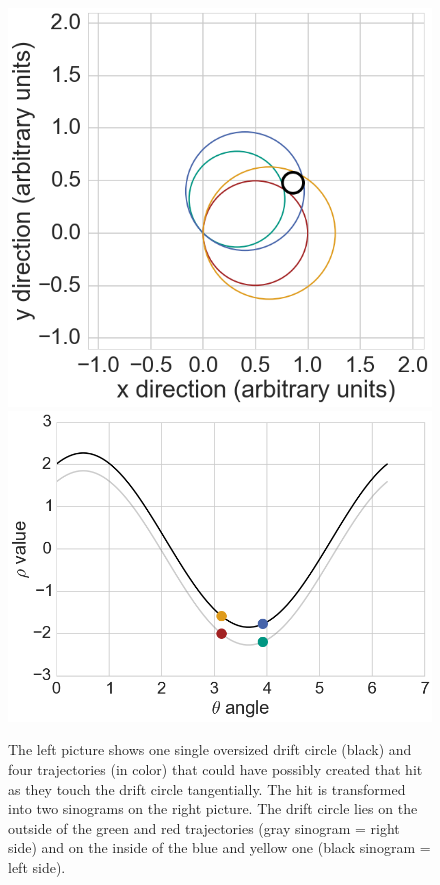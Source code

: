 \begin{figure}
  \centering
  \includegraphics[scale=0.27]{figures/theory/sinosodial_1.png}
  \hspace*{1cm}
  \includegraphics[scale=0.27]{figures/theory/sinosodial_2.png}
  \caption[Sinograms in the Legendre algorithm.]{The left picture shows one single oversized drift circle (black) and four trajectories (in color) that could have possibly created that hit as they touch the drift circle tangentially. The hit is transformed into two sinograms on the right picture. The drift circle lies on the outside of the green and red trajectories (gray sinogram = right side) and on the inside of the blue and yellow one (black sinogram = left side).}
  \label{fig-sinusodial}
\end{figure}


